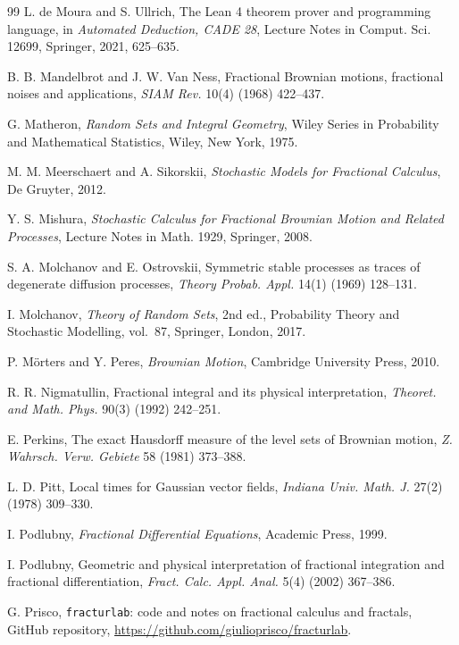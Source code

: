 \documentclass[11pt]{article}
\theoremstyle{remark}
\theoremstyle{definition}
\begin{document}
\begin{thebibliography}{99}
 L. de Moura and S. Ullrich, The Lean 4 theorem prover and programming language, in \emph{Automated Deduction, CADE 28}, Lecture Notes in Comput. Sci. 12699, Springer, 2021, 625--635.

 B. B. Mandelbrot and J. W. Van Ness, Fractional Brownian motions, fractional noises and applications, \emph{SIAM Rev.} 10(4) (1968) 422--437.

 G. Matheron, \emph{Random Sets and Integral Geometry}, Wiley Series in Probability and Mathematical Statistics, Wiley, New York, 1975.

 M. M. Meerschaert and A. Sikorskii, \emph{Stochastic Models for Fractional Calculus}, De Gruyter, 2012.

 Y. S. Mishura, \emph{Stochastic Calculus for Fractional Brownian Motion and Related Processes}, Lecture Notes in Math. 1929, Springer, 2008.

 S. A. Molchanov and E. Ostrovskii, Symmetric stable processes as traces of degenerate diffusion processes, \emph{Theory Probab. Appl.} 14(1) (1969) 128--131.

 I. Molchanov, \emph{Theory of Random Sets}, 2nd ed., Probability Theory and Stochastic Modelling, vol.~87, Springer, London, 2017.

 P. M\"orters and Y. Peres, \emph{Brownian Motion}, Cambridge University Press, 2010.

 R. R. Nigmatullin, Fractional integral and its physical interpretation, \emph{Theoret. and Math. Phys.} 90(3) (1992) 242--251.

 E. Perkins, The exact Hausdorff measure of the level sets of Brownian motion, \emph{Z. Wahrsch. Verw. Gebiete} 58 (1981) 373--388.

 L. D. Pitt, Local times for Gaussian vector fields, \emph{Indiana Univ. Math. J.} 27(2) (1978) 309--330.

 I. Podlubny, \emph{Fractional Differential Equations}, Academic Press, 1999.

 I. Podlubny, Geometric and physical interpretation of fractional integration and fractional differentiation, \emph{Fract. Calc. Appl. Anal.} 5(4) (2002) 367--386.

 G. Prisco, \texttt{fracturlab}: code and notes on fractional calculus and fractals, GitHub repository, \url{https://github.com/giulioprisco/fracturlab}.


\end{thebibliography}
\end{document}
